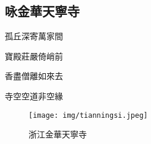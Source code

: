 \documentclass[a4j,12pt]{ltjtarticle}
\begin{document}
\begin{center}
	
	\newpage

	\begin{flushleft}
		\section{咏金華天寧寺}
	\end{flushleft}

	\vfill
		\LARGE 孤丘深寄萬家間\par
		寶殿莊嚴倚峭前\par
		香盡僧離如來去\par
		寺空空道非空緣\par
		\vspace{1.5cm} %
	\vfill

	
	\newpage
	\vfill
	\begin{figure}[h!]
		\centering
		\texttt{[image: img/tianningsi.jpeg]}
		\caption{浙江金華天寧寺}
		\label{fig:tianningsi}
	\end{figure}
	\vfill

	\end{center}
	
\end{document}
